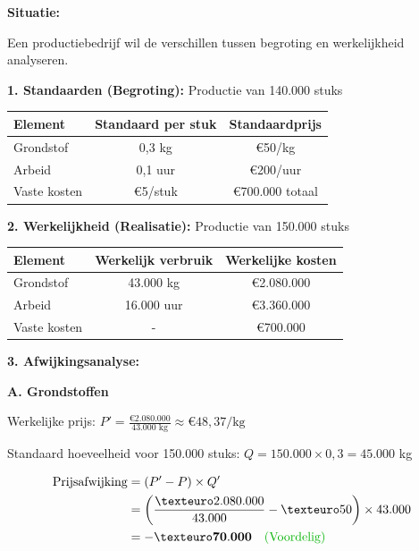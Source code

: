 \documentclass[a4paper,11pt]{article}
\begin{document}
\begin{oefenblok}
    \textbf{Situatie:}

    Een productiebedrijf wil de verschillen tussen begroting en werkelijkheid analyseren.

    \textbf{1. Standaarden (Begroting):} Productie van 140.000 stuks

    \begin{tabular}{lcc}
        \hline
        \textbf{Element} & \textbf{Standaard per stuk} & \textbf{Standaardprijs} \\
        \hline
        Grondstof        & 0,3 kg                      & €50/kg                  \\
        Arbeid           & 0,1 uur                     & €200/uur                \\
        Vaste kosten     & €5/stuk                     & €700.000 totaal         \\
        \hline
    \end{tabular}

    \textbf{2. Werkelijkheid (Realisatie):} Productie van 150.000 stuks

    \begin{tabular}{lcc}
        \hline
        \textbf{Element} & \textbf{Werkelijk verbruik} & \textbf{Werkelijke kosten} \\
        \hline
        Grondstof        & 43.000 kg                   & €2.080.000                 \\
        Arbeid           & 16.000 uur                  & €3.360.000                 \\
        Vaste kosten     & -                           & €700.000                   \\
        \hline
    \end{tabular}

    \textbf{3. Afwijkingsanalyse:}

    \textbf{A. Grondstoffen}

    Werkelijke prijs: $P' = \frac{€2.080.000}{43.000\text{ kg}} \approx €48,37/\text{kg}$

    Standaard hoeveelheid voor 150.000 stuks: $Q = 150.000 \times 0,3 = 45.000$ kg

    \begin{align*}
        \text{Prijsafwijking} & = (P' - P) \times Q'                                                     \\
                              & = \left(\frac{€2.080.000}{43.000} - €50\right) \times 43.000                                           \\
                              & = \mathbf{-€70.000} \quad \text{\textcolor{green!70!black}{(Voordelig)}}
    \end{align*}


\end{oefenblok}
\end{document}
